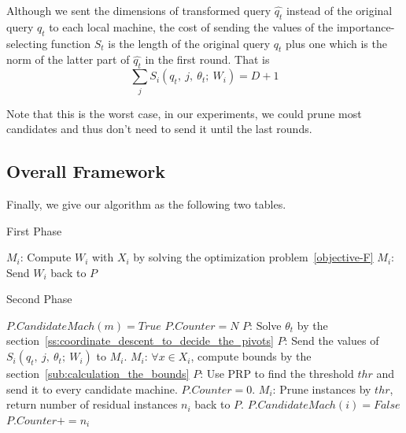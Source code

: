Although we sent the dimensions of transformed query $\hat{q_t}$ instead of the original query $q_t$ to each local machine, the cost of sending the values of the importance-selecting function $S_t$ is the length of the original query $q_t$ plus one which is the norm of the latter part of $\hat{q_t}$ in the first round.  That is
\[
	\sum_j{S_i(q_t,~j,~\theta_t;~W_i)} = D + 1
\]

Note that this is the worst case, in our experiments, we could prune most candidates and thus don't need to send it until the last rounds.




\subsection{Overall Framework} %
\label{ss:overall_framework}

Finally, we give our algorithm as the following two tables.

\begin{algorithm}
  \caption{First Phase}
  {
  	$M_i$: Compute $W_i$ with $X_i$ by solving the optimization problem~\eqref{objective-F}\;
  	$M_i$: Send $W_i$ back to $P$\;
  }
\end{algorithm}


\begin{algorithm}
  \caption{Second Phase}
  $P.CandidateMach(m)= True$\;
  $P.Counter=N$\;
  $P$: Solve $\theta_t$ by the section~\ref{ss:coordinate_descent_to_decide_the_pivots}\;
  {
	  {
	  	{
	  		$P$: Send the values of $S_i(q_t,~j,~\theta_t;~W_i)$ to $M_i$.\;
		  	$M_i$: $\forall x\in X_i$, compute bounds by the section~\ref{sub:calculation_the_bounds}\;
	  	}
	  }
	  $P$: Use PRP to find the threshold $thr$ and send it to every candidate machine.\;
	  $P.Counter = 0$.\;
	  {
	  	{
		  	$M_i$: Prune instances by $thr$, return number of residual instances $n_i$ back to $P$.\;
			{
				$P.CandidateMach(i) = False$\;
			}
			$P.Counter += n_i$\;
	  	}
	  }
   }
\end{algorithm}




%
